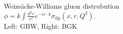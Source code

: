 \documentclass[11pt]{article}
\begin{document}
\begin{figure}[H]
\caption{Weizs\"acke-Williams gluon distrubution $\phi=k\int \frac{d^2r}{r^2} e^{-i r\cdot k} \sigma_{\mathrm{dp}}(x,r,Q^2)$.\\Left: GBW, Right: BGK
}
\end{figure}
\end{document}
